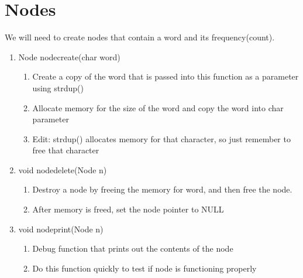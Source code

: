 \documentclass[11pt]{article}
\begin{document}
\section{Nodes}\label{ss:nodes}
We will need to create nodes that contain a word and its frequency(count).
\begin{enumerate}
\item Node nodecreate(char word)
	\begin{enumerate}
	\item Create a copy of the word that is passed into this function as a parameter using strdup()
	\item Allocate memory for the size of the word and copy the word into char parameter
	\item Edit: strdup() allocates memory for that character, so just remember to free that character
	\end{enumerate}
\item void nodedelete(Node n)
	\begin{enumerate}
	\item Destroy a node by freeing the memory for word, and then free the node.
	\item After memory is freed, set the node pointer to NULL
	\end{enumerate}
\item void nodeprint(Node n)
	\begin{enumerate}
	\item Debug function that prints out the contents of the node
	\item Do this function quickly to test if node is functioning properly
	\end{enumerate}
\end{enumerate}
\end{document}
